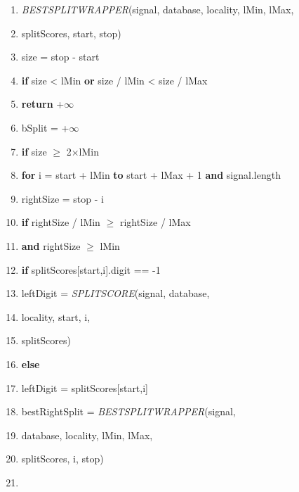 \documentclass[a4paper,11pt]{article}
\begin{document}
\begin{center}
\begin{enumerate}
\vspace{1cm}
\large
\item[] \textit{BESTSPLITWRAPPER}(signal, database, locality, lMin, lMax,
\item[] \hspace{4cm} splitScores, start, stop)
\item
size = stop - start
\item
\textbf{if} size < lMin \textbf{or} size / lMin < size / lMax
\item \hspace{1cm}
\textbf{return} +$\infty$
\item
bSplit = +$\infty$
\item
\textbf{if} size $\ge$ 2$\times$lMin
\item \hspace{1cm}
\textbf{for} i = start + lMin \textbf{to} start + lMax + 1 \textbf{and} signal.length
\item \hspace{2cm}
rightSize = stop - i
\item \hspace{2cm}
\textbf{if} rightSize / lMin $\ge$ rightSize / lMax
\item \hspace{4.7cm}
\textbf{and} rightSize $\ge$ lMin
\item \hspace{3cm}
\textbf{if} splitScores[start,i].digit == -1
\item \hspace{4cm}
leftDigit = \textit{SPLITSCORE}(signal, database, 
\item \hspace{8.5cm}
locality, start, i,
\item \hspace{8.5cm} 
splitScores)
\item \hspace{3cm}
\textbf{else}
\item \hspace{4cm}
leftDigit = splitScores[start,i]
\item \hspace{3cm}
bestRightSplit = \textit{BESTSPLITWRAPPER}(signal, 
\item \hspace{5.8cm}
database, locality, lMin, lMax, 
\item \hspace{5.8cm}
splitScores, i, stop)
\item \hspace{3cm}

\end{enumerate}
\end{center}
\end{document}
